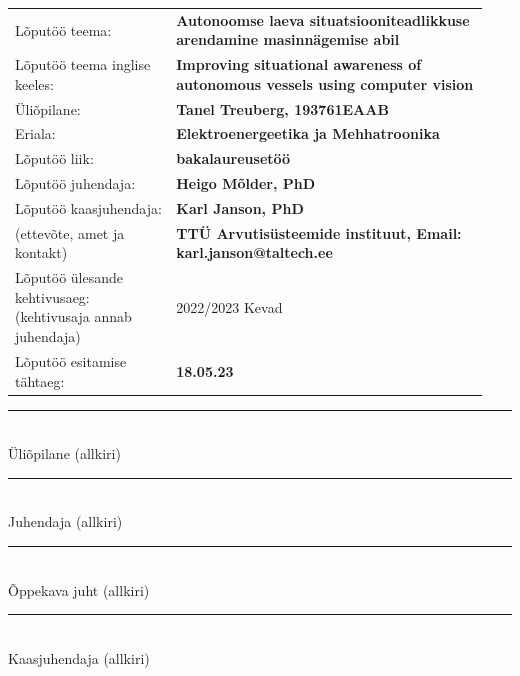 \begin{flushleft}
\renewcommand{\arraystretch}{1.3}
\begin{tabular}{@{}p{0.32\linewidth}p{0.62\linewidth}@{}}
\hline
Lõputöö teema:                                                  & \textbf{Autonoomse laeva situatsiooniteadlikkuse arendamine masinnägemise abil} \\
Lõputöö teema inglise keeles:                                   & \textbf{Improving situational awareness of autonomous vessels using computer vision} \\
Üliõpilane:                                                     & \textbf{Tanel Treuberg, 193761EAAB} \\
Eriala:                                                         & \textbf{Elektroenergeetika ja Mehhatroonika} \\
Lõputöö liik:                                                   & \textbf{bakalaureusetöö} \\
Lõputöö juhendaja:                                              & \textbf{Heigo Mõlder, PhD} \\
Lõputöö kaasjuhendaja:                                          & \textbf{Karl Janson, PhD} \\
(ettevõte, amet ja kontakt)                                     & \textbf{TTÜ Arvutisüsteemide instituut, Email: karl.janson@taltech.ee} \\
Lõputöö ülesande kehtivusaeg: (kehtivusaja annab juhendaja)     & 2022/2023 Kevad \\
Lõputöö esitamise tähtaeg:                                      & \textbf{18.05.23} \\
\hline
\end{tabular}
\end{flushleft}

\vspace{1.5em}

\begin{minipage}{\linewidth}
\noindent\rule{6cm}{0.4pt}\\
Üliõpilane (allkiri)

\noindent\rule{6cm}{0.4pt}\\
Juhendaja (allkiri)

\noindent\rule{6cm}{0.4pt}\\
Õppekava juht (allkiri)

\noindent\rule{6cm}{0.4pt}\\
Kaasjuhendaja (allkiri)
\end{minipage}

